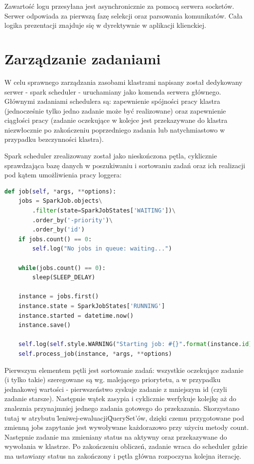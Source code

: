 \documentclass[a4paper,onecolumn,oneside,12pt]{memoir}
\begin{document}
{Zawartość logu przesyłana jest asynchronicznie za pomocą serwera socketów. Serwer
odpowiada za pierwszą fazę selekcji oraz parsowania komunikatów. Cała logika prezentacji
znajduje się w dyrektywnie w aplikacji klienckiej.

\section{Zarządzanie zadaniami}
\quad \quad W celu sprawnego zarządzania zasobami klastrami napisany został dedykowany
serwer - spark scheduler - uruchamiany jako komenda serwera głównego. Głównymi zadaniami
schedulera są: zapewnienie spójności pracy klastra (jednocześnie tylko jedno zadanie
może być realizowane) oraz zapewnienie ciągłości pracy (zadanie oczekujące w kolejce
jest przekazywane do klastra niezwłocznie po zakończeniu poprzedniego zadania lub
natychmiastowo w przypadku bezczynności klastra).

Spark scheduler zrealizowany został jako nieskończona pętla, cyklicznie sprawdzająca
bazę danych w poszukiwaniu i sortowaniu zadań oraz ich realizacji pod kątem umożliwienia
pracy loggera:

\begin{lstlisting}[language=Python, caption=Główna pętla Spark Schedulera]
def job(self, *args, **options):
	jobs = SparkJob.objects\
		.filter(state=SparkJobStates['WAITING'])\
		.order_by('-priority')\
		.order_by('id')
	if jobs.count() == 0:
		self.log("No jobs in queue: waiting...")

	while(jobs.count() == 0):
		sleep(SLEEP_DELAY)

	instance = jobs.first()
	instance.state = SparkJobStates['RUNNING']
	instance.started = datetime.now()
	instance.save()

	self.log(self.style.WARNING("Starting job: #{}".format(instance.id)))
	self.process_job(instance, *args, **options)
\end{lstlisting}

Pierwszym elementem pętli jest sortowanie zadań: wszystkie oczekujące zadanie (i tylko takie)
szeregowane są wg. malejącego priorytetu, a w przypadku jednakowej wartości - pierwszeństwo
zyskuje zadanie z mniejszym id (czyli zadanie starsze). Następnie wątek zasypia i cyklicznie
werfykuje kolejkę aż do znaleznia przynajmniej jednego zadania gotowego do przekazania.
Skorzystano tutaj w atrybutu \"leniwej-ewaluacji\" QuerySet'ów, dzięki czemu przygotowane
pod zmienną jobs zapytanie jest wywoływane każdorazowo przy użyciu metody count.
Następnie zadanie ma zmieniany status na aktywny oraz przekazywane do wywołania w klastrze.
Po zakończeniu obliczeń, zadanie wraca do scheduler gdzie ma ustawiany status na zakończony
i pętla główna rozpoczyna kolejna iterację.

}
\end{document}
